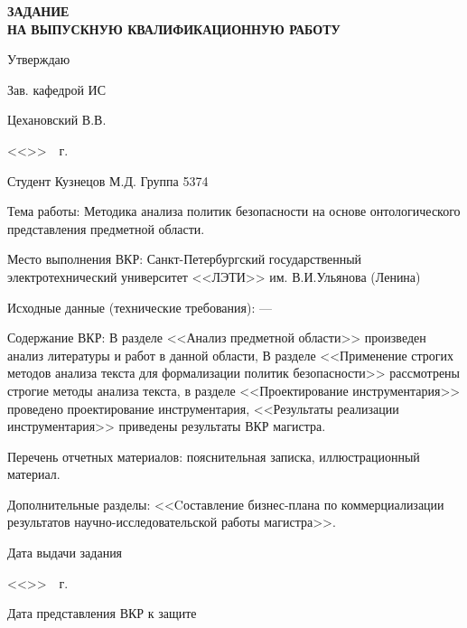 \documentclass[../main]{subfiles}
\begin{document}
\newpage

\begin{titlepage}
    \centering
        
    \MakeUppercase{\bfseries\large
        задание\\
        на выпускную квалификационную работу
    }

    \vspace{2mm}

    \hfill Утверждаю

    \hfill Зав. кафедрой ИС

    \hfill {} Цехановский В.В.

    \hfill <<\underline{\hspace{1cm}}>>\underline{\hspace{5cm}}~\the\year~г.

    \vspace{2mm}

    \parbox[t]{\textwidth}{
        Студент Кузнецов М.Д. \hfill Группа 5374

        Тема работы: Методика анализа политик безопасности на основе онтологического представления предметной области.

        Место выполнения ВКР: Санкт-Петербургский государственный электротехнический университет 
        <<ЛЭТИ>> им. В.И.Ульянова (Ленина)
        
        Исходные данные (технические требования): ---

        Содержание ВКР: В разделе <<Анализ предметной области>> произведен анализ литературы и работ в данной области, В разделе <<Применение строгих методов анализа текста для формализации политик безопасности>> рассмотрены строгие методы анализа текста, в разделе <<Проектирование инструментария>> проведено проектирование инструментария, <<Результаты реализации инструментария>> приведены результаты ВКР магистра.

        Перечень отчетных материалов: пояснительная записка, иллюстрационный материал.

        Дополнительные разделы: <<Cоставление бизнес-плана по коммерциализации результатов научно-исследовательской работы магистра>>.
    }

    \vfill

    \begin{minipage}[t]{6cm}
        Дата выдачи задания

        <<\underline{\hspace{1cm}}>>\underline{\hspace{3cm}}~\the\year~г.
    \end{minipage}
    \hfill
    \begin{minipage}[t]{8cm}
        Дата представления ВКР к защите


\end{minipage}
\end{titlepage}
\end{document}
